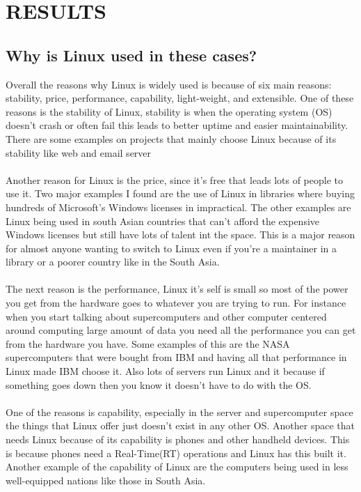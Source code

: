 \documentclass{article}
\begin{document}
\section{RESULTS}
\subsection{Why is Linux used in these cases?}
Overall the reasons why Linux is widely used is because of six main reasons: stability, price, performance, capability, light-weight, and extensible.
One of these reasons is the stability of Linux, stability is when the operating system (OS) doesn't crash or often fail this leads to better uptime and easier maintainability.
There are some examples on projects that mainly choose Linux because of its stability like web and email server 
\\ \\
Another reason for Linux is the price, since it's free that leads lots of people to use it.
Two major examples I found are the use of Linux in libraries where buying hundreds of Microsoft's Windows licenses in impractical.
The other examples are Linux being used in south Asian countries that can't afford the expensive Windows licenses but still have lots of talent int the space.
This is a major reason for almost anyone wanting to switch to Linux even if you're a maintainer in a library or a poorer country like in the South Asia.
\\ \\
The next reason is the performance, Linux it's self is small so most of the power you get from the hardware goes to whatever you are trying to run.
For instance when you start talking about supercomputers and other computer centered around computing large amount of data you need all the performance you can get from the hardware you have.
Some examples of this are the NASA supercomputers that were bought from IBM and having all that performance in Linux made IBM choose it. 
Also lots of servers run Linux and it because if something goes down then you know it doesn't have to do with the OS. 
\\ \\
One of the reasons is capability, especially in the server and supercomputer space the things that Linux offer just doesn't exist in any other OS.
Another space that needs Linux because of its capability is phones and other handheld devices.
This is because phones need a Real-Time(RT) operations and Linux has this built it. 
Another example of the capability of Linux are the computers being used in less well-equipped nations like those in South Asia.
\end{document}
